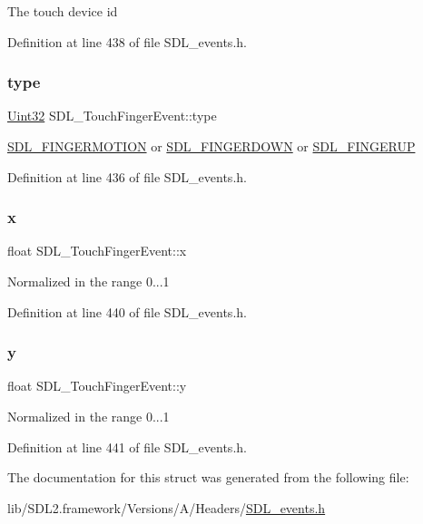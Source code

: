 The touch device id 

Definition at line 438 of file S\+D\+L\+\_\+events.\+h.

\mbox{\label{struct_s_d_l___touch_finger_event_a3883218fa3426065ca66086c100edbfa}} 
\subsubsection{\texorpdfstring{type}{type}}
{\footnotesize\ttfamily \mbox{\hyperlink{_s_d_l__stdinc_8h_add440eff171ea5f55cb00c4a9ab8672d}{Uint32}} S\+D\+L\+\_\+\+Touch\+Finger\+Event\+::type}

\mbox{\hyperlink{_s_d_l__events_8h_a3b589e89be6b35c02e0dd34a55f3fccaa1862d7d009ade2c79b2f1fe4a30c9dd2}{S\+D\+L\+\_\+\+F\+I\+N\+G\+E\+R\+M\+O\+T\+I\+ON}} or \mbox{\hyperlink{_s_d_l__events_8h_a3b589e89be6b35c02e0dd34a55f3fccaaa712d1fa8bb69f6042e24a31e835a9ec}{S\+D\+L\+\_\+\+F\+I\+N\+G\+E\+R\+D\+O\+WN}} or \mbox{\hyperlink{_s_d_l__events_8h_a3b589e89be6b35c02e0dd34a55f3fccaa8266a108a628cc698c5172e72c1fc1e6}{S\+D\+L\+\_\+\+F\+I\+N\+G\+E\+R\+UP}} 

Definition at line 436 of file S\+D\+L\+\_\+events.\+h.

\mbox{\label{struct_s_d_l___touch_finger_event_a0ce44b1342220fa17e9b9b4a77c2c906}} 
\subsubsection{\texorpdfstring{x}{x}}
{\footnotesize\ttfamily float S\+D\+L\+\_\+\+Touch\+Finger\+Event\+::x}

Normalized in the range 0...1 

Definition at line 440 of file S\+D\+L\+\_\+events.\+h.

\mbox{\label{struct_s_d_l___touch_finger_event_ac2bb8af638d2927a8e13f6ffe8f9384e}} 
\subsubsection{\texorpdfstring{y}{y}}
{\footnotesize\ttfamily float S\+D\+L\+\_\+\+Touch\+Finger\+Event\+::y}

Normalized in the range 0...1 

Definition at line 441 of file S\+D\+L\+\_\+events.\+h.



The documentation for this struct was generated from the following file\+:\begin{DoxyCompactItemize}
\item 
lib/\+S\+D\+L2.\+framework/\+Versions/\+A/\+Headers/\mbox{\hyperlink{_s_d_l__events_8h}{S\+D\+L\+\_\+events.\+h}}\end{DoxyCompactItemize}
